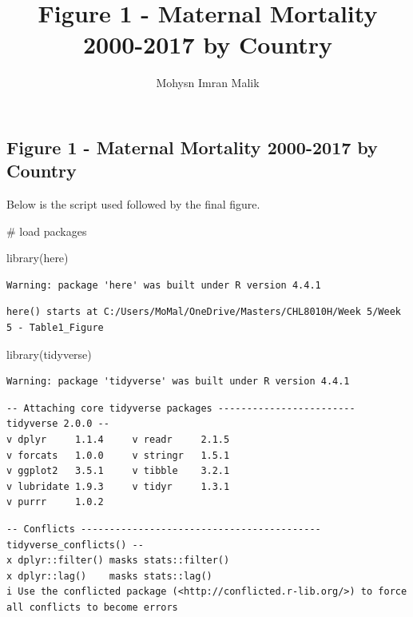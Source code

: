 \documentclass[
  letterpaper,
  DIV=11,
  numbers=noendperiod]{scrartcl}
\title{Figure 1 - Maternal Mortality 2000-2017 by Country}
\author{Mohysn Imran Malik}
\date{}
\newenvironment{Shaded}{\begin{snugshade}}{\end{snugshade}}
\newcommand{\CommentTok}[1]{\textcolor[rgb]{0.37,0.37,0.37}{#1}}
\newcommand{\FunctionTok}[1]{\textcolor[rgb]{0.28,0.35,0.67}{#1}}
\newcommand{\NormalTok}[1]{\textcolor[rgb]{0.00,0.23,0.31}{#1}}
\begin{document}
\maketitle


\subsection{Figure 1 - Maternal Mortality 2000-2017 by
Country}\label{figure-1---maternal-mortality-2000-2017-by-country}

Below is the script used followed by the final figure.

\begin{Shaded}
\begin{Highlighting}[]
\CommentTok{\# load packages}

\FunctionTok{library}\NormalTok{(here)}
\end{Highlighting}
\end{Shaded}

\begin{verbatim}
Warning: package 'here' was built under R version 4.4.1
\end{verbatim}

\begin{verbatim}
here() starts at C:/Users/MoMal/OneDrive/Masters/CHL8010H/Week 5/Week 5 - Table1_Figure
\end{verbatim}

\begin{Shaded}
\begin{Highlighting}[]
\FunctionTok{library}\NormalTok{(tidyverse)}
\end{Highlighting}
\end{Shaded}

\begin{verbatim}
Warning: package 'tidyverse' was built under R version 4.4.1
\end{verbatim}

\begin{verbatim}
-- Attaching core tidyverse packages ------------------------ tidyverse 2.0.0 --
v dplyr     1.1.4     v readr     2.1.5
v forcats   1.0.0     v stringr   1.5.1
v ggplot2   3.5.1     v tibble    3.2.1
v lubridate 1.9.3     v tidyr     1.3.1
v purrr     1.0.2     
\end{verbatim}

\begin{verbatim}
-- Conflicts ------------------------------------------ tidyverse_conflicts() --
x dplyr::filter() masks stats::filter()
x dplyr::lag()    masks stats::lag()
i Use the conflicted package (<http://conflicted.r-lib.org/>) to force all conflicts to become errors
\end{verbatim}
\end{document}
